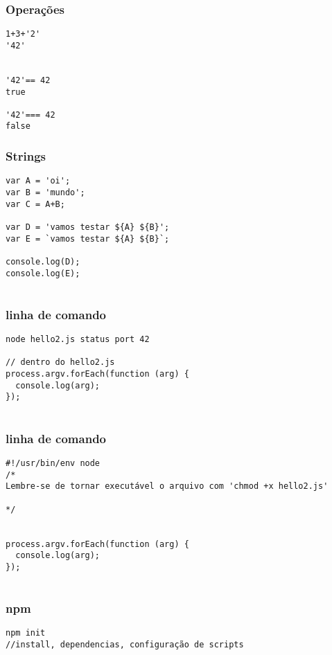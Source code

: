\documentclass[14pt]{beamer}
\begin{document}
\begin{frame}[fragile]
 \frametitle{Operações}
\begin{lstlisting}[basicstyle=\tiny\ttfamily]
1+3+'2'
'42'


'42'== 42
true

'42'=== 42
false

\end{lstlisting}

\end{frame}

\begin{frame}[fragile]
 \frametitle{Strings}
\begin{verbatim}
var A = 'oi';
var B = 'mundo';
var C = A+B;

var D = 'vamos testar ${A} ${B}';
var E = `vamos testar ${A} ${B}`;

console.log(D);
console.log(E);


\end{verbatim}

\end{frame}

\begin{frame}[fragile]
 \frametitle{linha de comando}
\begin{lstlisting}[basicstyle=\tiny\ttfamily]
node hello2.js status port 42

// dentro do hello2.js
process.argv.forEach(function (arg) {
  console.log(arg);
});


\end{lstlisting}

\end{frame}

\begin{frame}[fragile]
 \frametitle{linha de comando}
\begin{lstlisting}[basicstyle=\tiny\ttfamily]
#!/usr/bin/env node
/* 
Lembre-se de tornar executável o arquivo com 'chmod +x hello2.js'

*/


process.argv.forEach(function (arg) {
  console.log(arg);
});


\end{lstlisting}

\end{frame}

\begin{frame}[fragile]
 \frametitle{npm}
\begin{lstlisting}[basicstyle=\tiny\ttfamily]
npm init
//install, dependencias, configuração de scripts

\end{lstlisting}

\end{frame}
\end{document}
